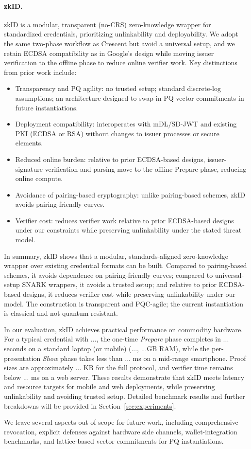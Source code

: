 \paragraph{zkID.}
zkID is a modular, transparent (no-CRS) zero-knowledge wrapper for standardized credentials, prioritizing unlinkability and deployability. We adopt the same two-phase workflow as Crescent but avoid a universal setup, and we retain ECDSA compatibility as in Google’s design while moving issuer verification to the offline phase to reduce online verifier work. Key distinctions from prior work include:
\begin{itemize}
  \item Transparency and PQ agility: no trusted setup; standard discrete-log assumptions; an architecture designed to swap in PQ vector commitments in future instantiations.
  \item Deployment compatibility: interoperates with mDL/SD-JWT and existing PKI (ECDSA or RSA) without changes to issuer processes or secure elements.
  \item Reduced online burden: relative to prior ECDSA-based designs, issuer-signature verification and parsing move to the offline Prepare phase, reducing online compute.
  \item Avoidance of pairing-based cryptography: unlike pairing-based schemes, zkID avoids pairing-friendly curves.
  \item Verifier cost: reduces verifier work relative to prior ECDSA-based designs under our constraints while preserving unlinkability under the stated threat model.
\end{itemize}

In summary, zkID shows that a modular, standards-aligned zero-knowledge wrapper over existing credential formats can be built. Compared to pairing-based schemes, it avoids dependence on pairing-friendly curves; compared to universal-setup SNARK wrappers, it avoids a trusted setup; and relative to prior ECDSA-based designs, it reduces verifier cost while preserving unlinkability under our model. The construction is transparent and PQC-agile; the current instantiation is classical and not quantum-resistant.

In our evaluation, zkID achieves practical performance on commodity hardware. For a typical credential with ..., the one-time \emph{Prepare} phase completes in ... seconds on a standard laptop (or mobile) (..., ...GB RAM), while the per-presentation \emph{Show} phase takes less than ... ms on a mid-range smartphone. Proof sizes are approximately ... KB for the full protocol, and verifier time remains below ... ms on a web server. These results demonstrate that zkID meets latency and resource targets for mobile and web deployments, while preserving unlinkability and avoiding trusted setup. Detailed benchmark results and further breakdowns will be provided in Section~\ref{sec:experiments}.

We leave several aspects out of scope for future work, including comprehensive revocation, explicit defenses against hardware side channels, wallet-integration benchmarks, and lattice-based vector commitments for PQ instantiations.